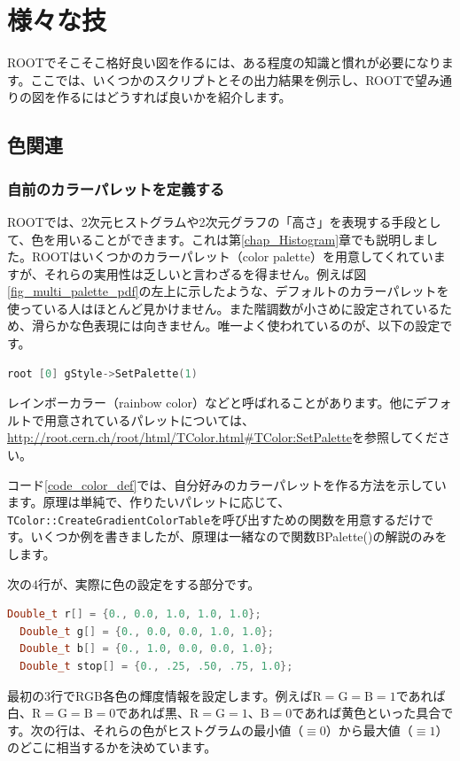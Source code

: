 \chapter{様々な技}

ROOTでそこそこ格好良い図を作るには、ある程度の知識と慣れが必要になります。ここでは、いくつかのスクリプトとその出力結果を例示し、ROOTで望み通りの図を作るにはどうすれば良いかを紹介します。

\section{色関連}
\subsection{自前のカラーパレットを定義する}

ROOTでは、2次元ヒストグラムや2次元グラフの「高さ」を表現する手段として、色を用いることができます。これは第\ref{chap_Histogram}章でも説明しました。ROOTはいくつかのカラーパレット（color palette）を用意してくれていますが、それらの実用性は乏しいと言わざるを得ません。例えば図\ref{fig_multi_palette_pdf}の左上に示したような、デフォルトのカラーパレットを使っている人はほとんど見かけません。また階調数が小さめに設定されているため、滑らかな色表現には向きません。唯一よく使われているのが、以下の設定です。
\begin{lstlisting}[language=C++]
root [0] gStyle->SetPalette(1)
\end{lstlisting}
レインボーカラー（rainbow color）などと呼ばれることがあります。他にデフォルトで用意されているパレットについては、\url{http://root.cern.ch/root/html/TColor.html#TColor:SetPalette}を参照してください。

コード\ref{code_color_def}では、自分好みのカラーパレットを作る方法を示しています。原理は単純で、作りたいパレットに応じて、\texttt{TColor::CreateGradientColorTable}を呼び出すための関数を用意するだけです。いくつか例を書きましたが、原理は一緒なので関数BPalette()の解説のみをします。

\begin{NoFloat}

\end{NoFloat}

次の4行が、実際に色の設定をする部分です。
\begin{lstlisting}[language=c++]
  Double_t r[] = {0., 0.0, 1.0, 1.0, 1.0}; 
  Double_t g[] = {0., 0.0, 0.0, 1.0, 1.0}; 
  Double_t b[] = {0., 1.0, 0.0, 0.0, 1.0}; 
  Double_t stop[] = {0., .25, .50, .75, 1.0}; 
\end{lstlisting}
最初の3行でRGB各色の輝度情報を設定します。例えば$\mathrm{R}=\mathrm{G}=\mathrm{B}=1$であれば白、$\mathrm{R}=\mathrm{G}=\mathrm{B}=0$であれば黒、$\mathrm{R}=\mathrm{G}=1$、$\mathrm{B}=0$であれば黄色といった具合です。次の行は、それらの色がヒストグラムの最小値（$\equiv0$）から最大値（$\equiv1$）のどこに相当するかを決めています。

